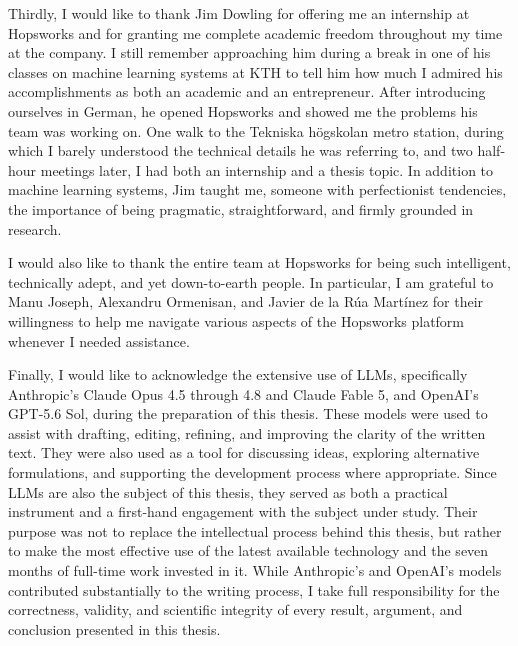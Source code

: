 \documentclass[
english,                 %
bibtex,                  %
]{kththesis}
\numberwithin{listing}{chapter}
\begin{document}
Thirdly, I would like to thank Jim Dowling for offering me an internship at Hopsworks and for granting me complete academic freedom throughout my time at the company. I still remember approaching him during a break in one of his classes on machine learning systems at KTH to tell him how much I admired his accomplishments as both an academic and an entrepreneur. After introducing ourselves in German, he opened Hopsworks and showed me the problems his team was working on. One walk to the Tekniska högskolan metro station, during which I barely understood the technical details he was referring to, and two half-hour meetings later, I had both an internship and a thesis topic. In addition to machine learning systems, Jim taught me, someone with perfectionist tendencies, the importance of being pragmatic, straightforward, and firmly grounded in research.

I would also like to thank the entire team at Hopsworks for being such intelligent, technically adept, and yet down-to-earth people. In particular, I am grateful to Manu Joseph, Alexandru Ormenisan, and Javier de la Rúa Martínez for their willingness to help me navigate various aspects of the Hopsworks platform whenever I needed assistance.

Finally, I would like to acknowledge the extensive use of \glspl{LLM}, specifically Anthropic's Claude Opus 4.5 through 4.8 and Claude Fable 5, and \gls{OpenAI}'s \gls{GPT}-5.6 Sol, during the preparation of this thesis. These models were used to assist with drafting, editing, refining, and improving the clarity of the written text. They were also used as a tool for discussing ideas, exploring alternative formulations, and supporting the development process where appropriate. Since \glspl{LLM} are also the subject of this thesis, they served as both a practical instrument and a first-hand engagement with the subject under study. Their purpose was not to replace the intellectual process behind this thesis, but rather to make the most effective use of the latest available technology and the seven months of full-time work invested in it. While Anthropic's and \gls{OpenAI}'s models contributed substantially to the writing process, I take full responsibility for the correctness, validity, and scientific integrity of every result, argument, and conclusion presented in this thesis.

\acknowlegmentssignature

\renewcommand{\chaptermark}[1]{ \markboth{#1}{}}
\tableofcontents
  \markboth{\contentsname}{}
\end{document}

